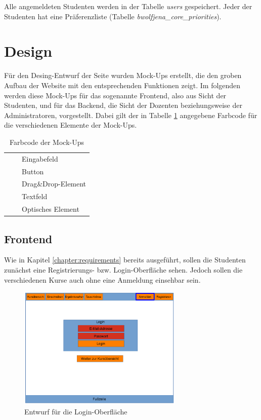         Alle angemeldeten Studenten werden in der Tabelle \textit{users} gespeichert.
        Jeder der Studenten hat eine Präferenzliste (Tabelle \textit{bwolfjena\_core\_priorities}).
        
    
    \section{Design}
        Für den Desing-Entwurf der Seite wurden Mock-Ups erstellt, die den groben Aufbau der Website mit den entsprechenden Funktionen zeigt. 
        Im folgenden werden diese Mock-Ups für das sogenannte Frontend, also aus Sicht der Studenten, und für das Backend, die Sicht der Dozenten beziehungsweise der Administratoren, vorgestellt.
        Dabei gilt der in Tabelle \ref{tab:Farbcode} angegebene Farbcode für die verschiedenen Elemente der Mock-Ups.
        \begin{table}
            \centering
            \begin{tabular}{l c| l}
                \cellcolor{red} & & Eingabefeld\\
                \cellcolor{orange} & & Button\\
                \cellcolor{olive} & & Drag\&Drop-Element\\
                \cellcolor{green} & & Textfeld\\
                \cellcolor{blue} & & Optisches Element
            \end{tabular}
            \caption{Farbcode der Mock-Ups}
            \label{tab:Farbcode}
        \end{table}
    
        \subsection{Frontend}
            Wie in Kapitel \ref{chapter:requirements} bereits ausgeführt, sollen die Studenten zunächst eine Registrierungs- bzw. Login-Oberfläche sehen.
            Jedoch sollen die verschiedenen Kurse auch ohne eine Anmeldung einsehbar sein.
            \begin{figure}[t]
            	\centering
            	\includegraphics[width=0.7\textwidth]{./design/images/MockUpsFrontend/frontendLogin.png}
            	\caption{Entwurf für die Login-Oberfläche}
            	\label{mockupLoginFrontend}
            \end{figure}   
        
